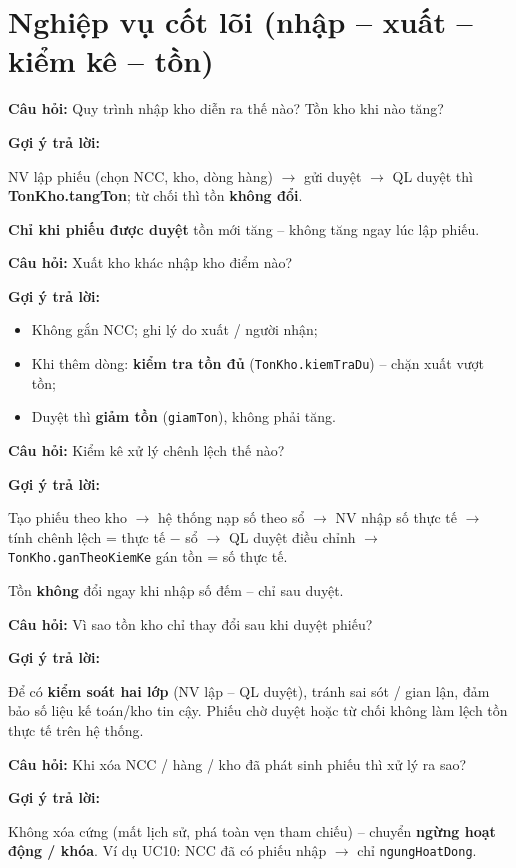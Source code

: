 \documentclass[12pt,a4paper]{article}
\newcommand{\cau}[1]{\textbf{\textcolor{qblue}{Câu hỏi:}} #1}
\newcommand{\traloi}{\par\smallskip\textbf{\textcolor{qblue!70!black}{Gợi ý trả lời:}}\par}
\begin{document}
\section{Nghiệp vụ cốt lõi (nhập -- xuất -- kiểm kê -- tồn)}

\begin{cauhoi}
\cau{Quy trình nhập kho diễn ra thế nào? Tồn kho khi nào tăng?}
\traloi
NV lập phiếu (chọn NCC, kho, dòng hàng) $\rightarrow$ gửi duyệt $\rightarrow$ QL duyệt thì \textbf{TonKho.tangTon}; từ chối thì tồn \textbf{không đổi}.

\textbf{Chỉ khi phiếu được duyệt} tồn mới tăng -- không tăng ngay lúc lập phiếu.
\end{cauhoi}

\begin{cauhoi}
\cau{Xuất kho khác nhập kho điểm nào?}
\traloi
\begin{itemize}[leftmargin=1.4em,itemsep=2pt]
  \item Không gắn NCC; ghi lý do xuất / người nhận;
  \item Khi thêm dòng: \textbf{kiểm tra tồn đủ} (\texttt{TonKho.kiemTraDu}) -- chặn xuất vượt tồn;
  \item Duyệt thì \textbf{giảm tồn} (\texttt{giamTon}), không phải tăng.
\end{itemize}
\end{cauhoi}

\begin{cauhoi}[Câu 19]
\cau{Kiểm kê xử lý chênh lệch thế nào?}
\traloi
Tạo phiếu theo kho $\rightarrow$ hệ thống nạp số theo sổ $\rightarrow$ NV nhập số thực tế $\rightarrow$ tính chênh lệch = thực tế $-$ sổ $\rightarrow$ QL duyệt điều chỉnh $\rightarrow$ \texttt{TonKho.ganTheoKiemKe} gán tồn = số thực tế.

Tồn \textbf{không} đổi ngay khi nhập số đếm -- chỉ sau duyệt.
\end{cauhoi}

\begin{cauhoi}
\cau{Vì sao tồn kho chỉ thay đổi sau khi duyệt phiếu?}
\traloi
Để có \textbf{kiểm soát hai lớp} (NV lập -- QL duyệt), tránh sai sót / gian lận, đảm bảo số liệu kế toán/kho tin cậy. Phiếu chờ duyệt hoặc từ chối không làm lệch tồn thực tế trên hệ thống.
\end{cauhoi}

\begin{cauhoi}[Câu 21]
\cau{Khi xóa NCC / hàng / kho đã phát sinh phiếu thì xử lý ra sao?}
\traloi
Không xóa cứng (mất lịch sử, phá toàn vẹn tham chiếu) -- chuyển \textbf{ngừng hoạt động / khóa}. Ví dụ UC10: NCC đã có phiếu nhập $\rightarrow$ chỉ \texttt{ngungHoatDong}.
\end{cauhoi}
\end{document}
